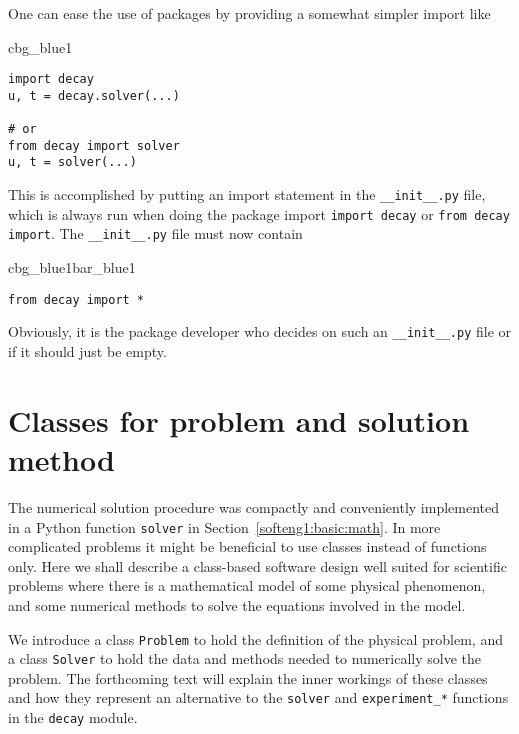\documentclass[graybox,sectrefs,envcountresetchap,open=right,final]{svmonodo}
\newenvironment{_cod_tight}[1]{
   \def\FrameCommand{\colorbox{#1}}
   \FrameRule0.6pt\MakeFramed {\FrameRestore}\vskip3mm}
   {\vskip0mm\endMakeFramed}
\newenvironment{cod}[1]{
\bgroup\rmfamily
\fboxsep=0mm\relax
\begin{_cod_tight}{#1}
\list{}{\parsep=-2mm\parskip=0mm\topsep=0pt\leftmargin=2mm
\rightmargin=2\leftmargin\leftmargin=4pt\relax}
\item\relax}
{\endlist\end{_cod_tight}\egroup}
\newenvironment{_pro_tight}[2]{
   \def\FrameCommand{\color{#2}\vrule width 1mm\normalcolor\colorbox{#1}}
   \FrameRule0.6pt\MakeFramed {\advance\hsize-2mm\FrameRestore}\vskip3mm}
   {\vskip0mm\endMakeFramed}
\newenvironment{pro}[2]{
\bgroup\rmfamily
\fboxsep=0mm\relax
\begin{_pro_tight}{#1}{#2}
\list{}{\parsep=-2mm\parskip=0mm\topsep=0pt\leftmargin=2mm
\rightmargin=2\leftmargin\leftmargin=4pt\relax}
\item\relax}
{\endlist\end{_pro_tight}\egroup}
\newenvironment{notice_mdfboxadmon}[1][]{
\begin{notice_mdfboxmdframed}[frametitle=#1]
}
{
\end{notice_mdfboxmdframed}
}
\begin{document}
\begin{notice_mdfboxadmon}
One can ease the use of packages by providing a somewhat simpler
import like

\begin{cod}{cbg_blue1}\begin{Verbatim}[numbers=none,fontsize=\fontsize{9pt}{9pt},baselinestretch=0.95,xleftmargin=2mm]
import decay
u, t = decay.solver(...)

# or
from decay import solver
u, t = solver(...)
\end{Verbatim}
\end{cod}
\noindent
This is accomplished by putting an import statement in the \Verb!__init__.py!
file, which is always run when doing the package import \texttt{import decay}
or \texttt{from decay import}. The \Verb!__init__.py! file must now contain

\begin{pro}{cbg_blue1}{bar_blue1}\begin{Verbatim}[numbers=none,fontsize=\fontsize{9pt}{9pt},baselinestretch=0.95,xleftmargin=2mm]
from decay import *
\end{Verbatim}
\end{pro}
\noindent
Obviously, it is the package developer who decides on such an
\Verb!__init__.py! file or if it should just be empty.
\end{notice_mdfboxadmon}




\section{Classes for problem and solution method}
\label{softeng1:prog:se:class}

The numerical solution procedure was compactly and conveniently
implemented in a Python function \texttt{solver} in Section~\ref{softeng1:basic:math}.  In more complicated problems it might be
beneficial to use classes instead of functions only. Here we shall
describe a class-based software design well suited for scientific
problems where there is a mathematical model of some physical
phenomenon, and some numerical methods to solve the equations involved
in the model.

We introduce a class \texttt{Problem} to hold the definition of the physical
problem, and a class \texttt{Solver} to hold the data and methods needed to
numerically solve the problem.  The forthcoming text will explain the
inner workings of these classes and how they represent an alternative
to the \texttt{solver} and \Verb!experiment_*! functions in the \texttt{decay}
module.
\end{document}
